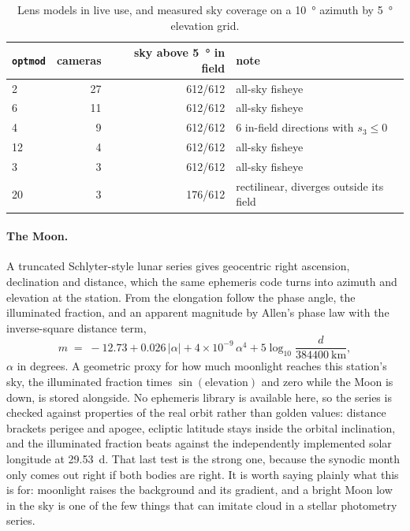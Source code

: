 \documentclass[11pt,a4paper]{article}
\begin{document}
\begin{table}[h]
\centering
\small
\begin{tabular}{lrrl}
\toprule
\texttt{optmod} & cameras & sky above \SI{5}{\degree} in field & note \\
\midrule
2  & 27 & \num{612}/\num{612} & all-sky fisheye \\
6  & 11 & \num{612}/\num{612} & all-sky fisheye \\
4  & 9  & \num{612}/\num{612} & 6 in-field directions with $s_3\le0$ \\
12 & 4  & \num{612}/\num{612} & all-sky fisheye \\
3  & 3  & \num{612}/\num{612} & all-sky fisheye \\
20 & 3  & \num{176}/\num{612} & rectilinear, diverges outside its field \\
\bottomrule
\end{tabular}
\caption{Lens models in live use, and measured sky coverage on a
\SI{10}{\degree} azimuth by \SI{5}{\degree} elevation grid.}
\label{tab:models}
\end{table}

\paragraph{The Moon.} A truncated Schlyter-style lunar series gives geocentric
right ascension, declination and distance, which the same ephemeris code turns
into azimuth and elevation at the station. From the elongation follow the phase
angle, the illuminated fraction, and an apparent magnitude by Allen's phase law
with the inverse-square distance term,
\begin{equation}
  m \;=\; -12.73 + 0.026\,|\alpha| + 4\times10^{-9}\,\alpha^4
          + 5\log_{10}\!\frac{d}{\SI{384400}{\kilo\meter}} ,
\end{equation}
$\alpha$ in degrees. A geometric proxy for how much moonlight reaches this
station's sky, the illuminated fraction times $\sin(\text{elevation})$ and zero
while the Moon is down, is stored alongside. No ephemeris library is available
here, so the series is checked against properties of the real orbit rather than
golden values: distance brackets perigee and apogee, ecliptic latitude stays
inside the orbital inclination, and the illuminated fraction beats against the
independently implemented solar longitude at \SI{29.53}{d}. That last test is
the strong one, because the synodic month only comes out right if both bodies
are right. It is worth saying plainly what this is for: moonlight raises the
background and its gradient, and a bright Moon low in the sky is one of the few
things that can imitate cloud in a stellar photometry series.
\end{document}
